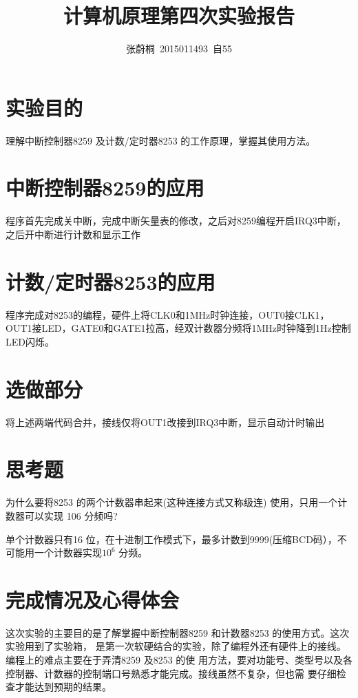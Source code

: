 \documentclass[UTF8,a4paper]{paper}
\title{计算机原理第四次实验报告}
\author{张蔚桐\ 2015011493\ 自55}
\begin{document}
\maketitle
\section{实验目的}
理解中断控制器8259 及计数/定时器8253 的工作原理，掌握其使用方法。
\section{中断控制器8259的应用}
程序首先完成关中断，完成中断矢量表的修改，之后对8259编程开启IRQ3中断，之后开中断进行计数和显示工作

\section{计数/定时器8253的应用}
程序完成对8253的编程，硬件上将CLK0和1MHz时钟连接，OUT0接CLK1，OUT1接LED，GATE0和GATE1拉高，经双计数器分频将1MHz时钟降到1Hz控制LED闪烁。

\section{选做部分}
将上述两端代码合并，接线仅将OUT1改接到IRQ3中断，显示自动计时输出

\section{思考题}
为什么要将8253 的两个计数器串起来(这种连接方式又称级连) 使用，只用一个计数器可以实现
106 分频吗?

单个计数器只有16 位，在十进制工作模式下，最多计数到9999(压缩BCD码），不可能用一个计数器实现$10^6$ 分频。
\section{完成情况及心得体会}
这次实验的主要目的是了解掌握中断控制器8259 和计数器8253 的使用方式。这次实验用到了实验箱，
是第一次软硬结合的实验，除了编程外还有硬件上的接线。编程上的难点主要在于弄清8259 及8253 的使
用方法，要对功能号、类型号以及各控制器、计数器的控制端口号熟悉才能完成。接线虽然不复杂，但也需
要仔细检查才能达到预期的结果。
\end{document}

